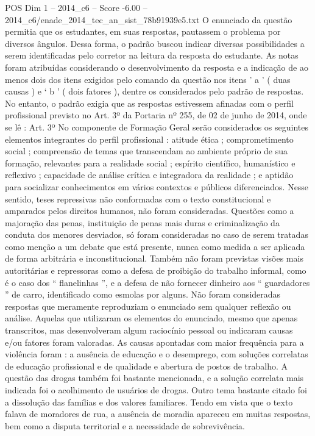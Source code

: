\begin{textsample}{POS Dim 1 – 2014\_c6 – Score -6.00 – 2014\_c6/enade\_2014\_tec\_an\_sist\_78b91939e5.txt}
O enunciado da questão permitia que os estudantes, em suas respostas, pautassem o problema por diversos ângulos.
Dessa forma, o padrão buscou indicar diversas possibilidades a serem identificadas pelo corretor na leitura da resposta do estudante.
As notas foram atribuídas considerando o desenvolvimento da resposta e a indicação de ao menos dois dos itens exigidos pelo comando da questão nos itens ’ a ’ ( duas causas ) e ‘ b ’ ( dois fatores ), dentre os considerados pelo padrão de respostas.
No entanto, o padrão exigia que as respostas estivessem afinadas com o perfil profissional previsto no Art. 3º da Portaria nº 255, de 02 de junho de 2014, onde se lê : Art. 3º No componente de Formação Geral serão considerados os seguintes elementos integrantes do perfil profissional : atitude ética ; comprometimento social ; compreensão de temas que transcendam ao ambiente próprio de sua formação, relevantes para a realidade social ; espírito científico, humanístico e reflexivo ; capacidade de análise crítica e integradora da realidade ; e aptidão para socializar conhecimentos em vários contextos e públicos diferenciados.
Nesse sentido, teses repressivas não conformadas com o texto constitucional e amparados pelos direitos humanos, não foram consideradas.
Questões como a majoração das penas, instituição de penas mais duras e criminalização da conduta dos menores desviados, só foram consideradas no caso de serem tratadas como menção a um debate que está presente, nunca como medida a ser aplicada de forma arbitrária e inconstitucional.
Também não foram previstas visões mais autoritárias e repressoras como a defesa de proibição do trabalho informal, como é o caso dos “ flanelinhas ”, e a defesa de não fornecer dinheiro aos “ guardadores ” de carro, identificado como esmolas por alguns.
Não foram consideradas respostas que meramente reproduziam o enunciado sem qualquer reflexão ou análise.
Aquelas que utilizaram os elementos do enunciado, mesmo que apenas transcritos, mas desenvolveram algum raciocínio pessoal ou indicaram causas e/ou fatores foram valoradas.
As causas apontadas com maior frequência para a violência foram : a ausência de educação e o desemprego, com soluções correlatas de educação profissional e de qualidade e abertura de postos de trabalho.
A questão das drogas também foi bastante mencionada, e a solução correlata mais indicada foi o acolhimento de usuários de drogas.
Outro tema bastante citado foi a dissolução das famílias e dos valores familiares.
Tendo em vista que o texto falava de moradores de rua, a ausência de moradia apareceu em muitas respostas, bem como a disputa territorial e a necessidade de sobrevivência.

\end{textsample}

